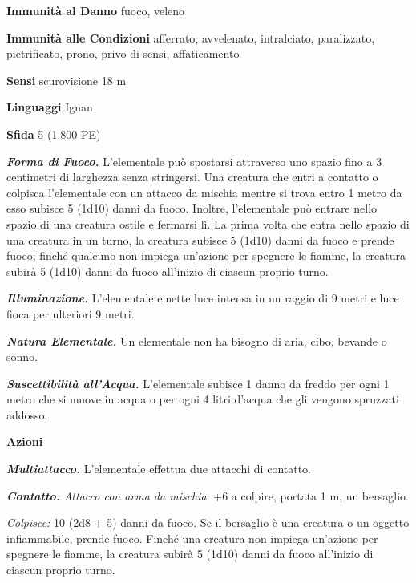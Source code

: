 \begin{multicols}{2}
\textbf{Immunità al Danno} fuoco, veleno

\textbf{Immunità alle Condizioni} afferrato, avvelenato, intralciato, paralizzato, pietrificato, prono, privo di sensi, affaticamento

\textbf{Sensi} scurovisione 18 m

\textbf{Linguaggi} Ignan

\textbf{Sfida} 5 (1.800 PE)

\emph{\textbf{Forma di Fuoco.}} L'elementale può spostarsi attraverso uno spazio fino a 3 centimetri di larghezza senza stringersi. Una creatura che entri a contatto o colpisca l'elementale con un attacco da mischia mentre si trova entro 1 metro da esso subisce 5 (1d10) danni da fuoco. Inoltre, l'elementale può entrare nello spazio di una creatura ostile e fermarsi lì. La prima volta che entra nello spazio di una creatura in un turno, la creatura subisce 5 (1d10) danni da fuoco e prende fuoco; finché qualcuno non impiega un'azione per spegnere le fiamme, la creatura subirà 5 (1d10) danni da fuoco all'inizio di ciascun proprio turno.

\emph{\textbf{Illuminazione.}} L'elementale emette luce intensa in un raggio di 9 metri e luce fioca per ulteriori 9 metri.

\emph{\textbf{Natura Elementale.}} Un elementale non ha bisogno di aria, cibo, bevande o sonno.

\emph{\textbf{Suscettibilità all'Acqua.}} L'elementale subisce 1 danno da freddo per ogni 1 metro che si muove in acqua o per ogni 4 litri d'acqua che gli vengono spruzzati addosso.

\textbf{Azioni}

\emph{\textbf{Multiattacco.}} L'elementale effettua due attacchi di contatto.

\emph{\textbf{Contatto.} Attacco con arma da mischia}: +6 a colpire, portata 1 m, un bersaglio.

\emph{Colpisce:} 10 (2d8 + 5) danni da fuoco. Se il bersaglio è una creatura o un oggetto infiammabile, prende fuoco. Finché una creatura non impiega un'azione per spegnere le fiamme, la creatura subirà 5 (1d10) danni da fuoco all'inizio di ciascun proprio turno.


\end{multicols}
